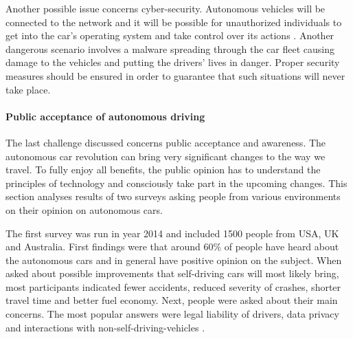 \documentclass[11pt,english,twoside]{article}
\begin{document}
\par

Another possible issue concerns cyber-security. Autonomous vehicles  will be connected to the network and it will be possible for unauthorized individuals to get into the car's operating system and take control over its actions \citep{douma2012criminal}. Another dangerous scenario involves a malware spreading through the car fleet causing damage to the vehicles and putting the drivers’ lives in danger. Proper security measures should be ensured in order to guarantee that such situations will never take place.















\paragraph{Public acceptance of autonomous driving}

\par

The last challenge discussed concerns public acceptance and awareness. The autonomous car revolution can bring very significant changes to the way we travel. To fully enjoy all benefits, the public opinion has to understand the principles of technology and consciously take part in the upcoming changes. This section analyses results of two surveys asking people from various environments on their opinion on autonomous cars.

\par
The first survey was run in year 2014 and included 1500 people from USA, UK and Australia. First findings were that around 60\% of people have heard about the autonomous cars and in general have positive opinion on the subject. When asked about possible improvements that self-driving cars will most likely bring, most participants indicated fewer accidents, reduced severity of crashes, shorter travel time and better fuel economy. Next, people were asked about their main concerns. The most popular answers were legal liability of drivers, data privacy and interactions with non-self-driving-vehicles \citep{schoettle2014survey}.
\end{document}
